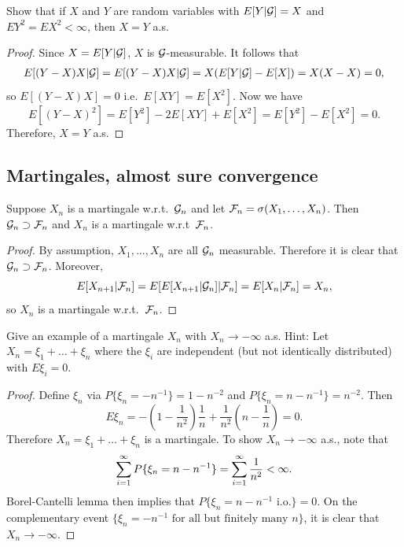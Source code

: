 \documentclass[a4paper]{article}
\begin{document}
\begin{ex}[Durrett 4.1.9]
  Show that if $X$ and $Y$ are random variables with $E[Y | \mathcal{G}] = X$ 
  and $E Y^2 = E X^2 < \infty$, then $X = Y$ a.s.
\end{ex}

\begin{proof}
  Since $X = E[Y | \mathcal{G}]$, $X$ is $\mathcal{G}$-measurable. It follows that 
  \begin{align*}
    E[(Y - X) X | \mathcal{G}] 
    = E[(Y - X) X | \mathcal{G}]
    = X (E[Y | \mathcal{G}] - E[X])
    = X (X - X) = 0,
  \end{align*}
  so $E[(Y - X) X] = 0$ i.e.\ $E[XY] = E[X^2]$. Now we have
  \[
  E[(Y - X)^2] = E[Y^2] - 2 E[XY] + E[X^2]
  = E[Y^2] - E[X^2] = 0.
  \]
  Therefore, $X = Y$ a.s.
\end{proof}

\subsection{Martingales, almost sure convergence}

\begin{ex}[Durret 4.2.1]
  Suppose $X_n$ is a martingale w.r.t.\ $\mathcal{G}_n$ and let 
  $\mathcal{F}_n = \sigma (X_1, \dots, X_n)$. Then $\mathcal{G}_n \supset 
  \mathcal{F}_n$ and $X_n$ is a martingale w.r.t\ $\mathcal{F}_n$.
\end{ex}

\begin{proof}
  By assumption, $X_1, \dots, X_n$ are all $\mathcal{G}_n$ measurable.
  Therefore it is clear that $\mathcal{G}_n \supset \mathcal{F}_n$. 
  Moreover,
  \[
  E[X_{n + 1} | \mathcal{F}_n] = E[E[X_{n+1} | \mathcal{G}_n] | \mathcal{F}_n]
  = E[X_n | \mathcal{F}_n] = X_n,
  \]
  so $X_n$ is a martingale w.r.t.\ $\mathcal{F}_n$.

\end{proof}

\begin{ex}[Durret 4.2.5]
  Give an example of a martingale $X_n$ with $X_n \to - \infty$ a.s.
  Hint: Let $X_n = \xi_1 + \dots + \xi_n$ where the $\xi_i$ are 
  independent (but not identically distributed) with $E \xi_i = 0$.
\end{ex}

\begin{proof}
  Define $\xi_n$ via $P \{\xi_n = - n^{-1}\} = 1 - n^{-2}$
  and $P\{\xi_n = n - n^{-1}\} = n^{-2}$. Then 
  \[
  E \xi_n = - \left( 1 - \frac{1}{n^2} \right) \frac{1}{n}
  + \frac{1}{n^2} \left( n - \frac{1}{n} \right) = 0.
  \]
  Therefore $X_n = \xi_1 + \dots + \xi_n$ is a martingale. To show 
  $X_n \to -\infty$ a.s., note that 
  \[
  \sum_{i=1}^\infty P\{\xi_n = n - n^{-1}\} = \sum_{i=1}^\infty \frac{1}{n^2} < \infty.
  \]
  Borel-Cantelli lemma then implies that $P \{\xi_n = n - n^{-1} 
  \text{ i.o.}\} = 0$. On the complementary event $\{\xi_n = -n^{-1} 
  \text{ for all but finitely many $n$}\}$, it is clear that 
  $X_n \to -\infty$.

\end{proof}
\end{document}
